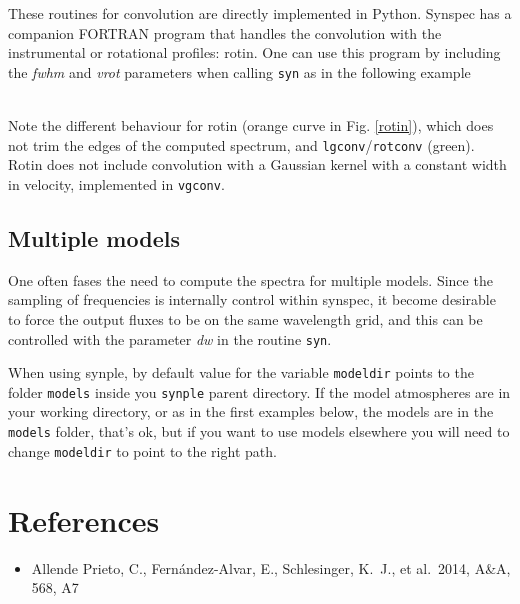 \documentclass[]{article}
\begin{document}
These routines for convolution are directly implemented in Python. Synspec has a companion FORTRAN program that handles the convolution with the instrumental or rotational profiles: rotin. One can use this program by including the {\it fwhm} and {\it vrot} parameters when calling {\tt syn} as in the following example

\\
\noindent Note the different behaviour for rotin (orange curve in Fig. \ref{rotin}), which does not trim the edges of the computed spectrum, and {\tt lgconv}/{\tt rotconv} (green). Rotin does not include convolution with a Gaussian kernel with a constant width in velocity, implemented in {\tt vgconv}. 

\subsection{Multiple models}

One often fases the need to compute the spectra for multiple models. Since the sampling of frequencies is internally control within synspec, it become desirable to force the output fluxes to be on the same wavelength grid, and this can be controlled with the parameter {\it dw} in the routine {\tt syn}.

When using synple, by default value for the variable {\tt modeldir} points to the folder {\tt models} inside you {\tt synple} parent directory. If the model atmospheres are in your working directory, or as in the first examples below, the models are in the {\tt models} folder, that's ok, but if you want to use models elsewhere you will need to change {\tt modeldir} to point to the right path.

\section{References}

\begin{itemize}
\item Allende Prieto, C., Fern{\'a}ndez-Alvar, E., Schlesinger, K.~J., et al.\ 2014, A\&A, 568, A7 
\end{itemize}
\end{document}
